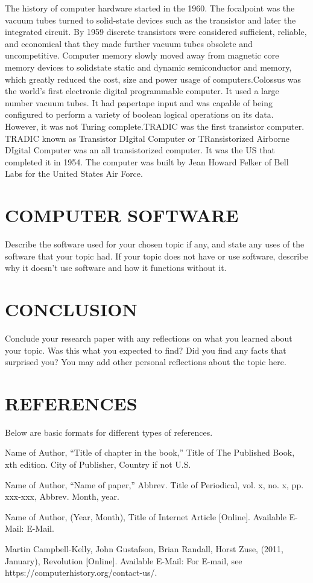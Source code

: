 \documentclass[letterpaper, 10 pt, conference]{IEEEconf}
\begin{document}
The history of computer hardware started in the 1960. The focalpoint was the  
vacuum tubes turned to solid-state devices such as the transistor and later 
the integrated circuit. By 1959 discrete transistors were considered 
sufficient, reliable, and economical that they made further vacuum tubes 
obsolete and uncompetitive. Computer memory slowly moved away from 
magnetic core memory devices to solidstate static and dynamic semiconductor and
memory, which greatly reduced the cost, size and power usage of 
computers.Colossus was the world's first electronic digital programmable 
computer. It used a large number vacuum tubes. It had papertape 
input and was capable of being configured to perform a variety of boolean 
logical operations on its data. However, it was not Turing complete.TRADIC was 
the first transistor computer. TRADIC known as Transistor DIgital Computer or 
TRansistorized Airborne DIgital Computer was an all transistorized computer. 
It was the US that completed it in 1954. The computer was built by Jean Howard 
Felker of Bell Labs for the United States Air Force. 

\section{COMPUTER SOFTWARE}

Describe the software used for your chosen topic if any,
and state any uses of the software that your topic had.
If your topic does not have or use software, describe why it
doesn't use software and how it functions without it.

\section{CONCLUSION}

Conclude your research paper with any reflections on what you
learned about your topic. Was this what you expected to find?
Did you find any facts that surprised you? You may add other
personal reflections about the topic here.

\section*{REFERENCES}

Below are basic formats for different types of references.

\begin{enumerate}[label={[\arabic*]}]
\item Name of Author, ``Title of chapter in the book,''
Title of The Published Book, xth edition. City of
Publisher, Country if not U.S.
\item Name of Author, “Name of paper,” Abbrev.
Title of Periodical, vol. x, no. x, pp. xxx-xxx,
Abbrev. Month, year.
\item Name of Author, (Year, Month),
Title of Internet Article [Online]. Available E-Mail:
E-Mail.
\item Martin Campbell-Kelly, John Gustafson, 
Brian Randall, Horst Zuse, (2011, January),
Revolution [Online]. Available E-Mail:
For E-mail, see https://computerhistory.org/contact-us/.
\end{enumerate}
\end{document}
